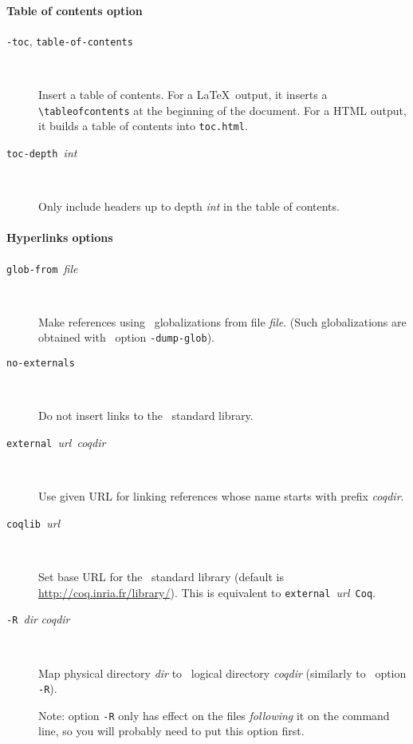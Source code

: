 \paragraph{Table of contents option}

\begin{description}

\item[\texttt{-toc}, \texttt{\mm{}table-of-contents}] ~\par

  Insert a table of contents.
  For a \LaTeX\ output, it inserts a \verb!\tableofcontents! at the
  beginning of the document. For a HTML output, it builds a table of
  contents into \texttt{toc.html}.

\item[\texttt{\mm{}toc-depth }\textit{int}] ~\par

  Only include headers up to depth \textit{int} in the table of
  contents.

\end{description}

\paragraph{Hyperlinks options}
\begin{description}

\item[\texttt{\mm{}glob-from }\textit{file}] ~\par
  
  Make references using \Coq\ globalizations from file \textit{file}. 
  (Such globalizations are obtained with \Coq\ option \texttt{-dump-glob}).

\item[\texttt{\mm{}no-externals}] ~\par
  
  Do not insert links to the \Coq\ standard library.

\item[\texttt{\mm{}external }\textit{url}~\textit{coqdir}] ~\par
  
  Use given URL for linking references whose name starts with prefix
  \textit{coqdir}.

\item[\texttt{\mm{}coqlib }\textit{url}] ~\par

  Set base URL for the \Coq\ standard library (default is 
  \url{http://coq.inria.fr/library/}). This is equivalent to
  \texttt{\mm{}external }\textit{url}~\texttt{Coq}.

\item[\texttt{-R }\textit{dir }\textit{coqdir}] ~\par

  Map physical directory \textit{dir} to \Coq\ logical directory
  \textit{coqdir} (similarly to \Coq\ option \texttt{-R}).

  Note: option \texttt{-R} only has effect on the files
  \emph{following} it on the command line, so you will probably need
  to put this option first.

\end{description}

